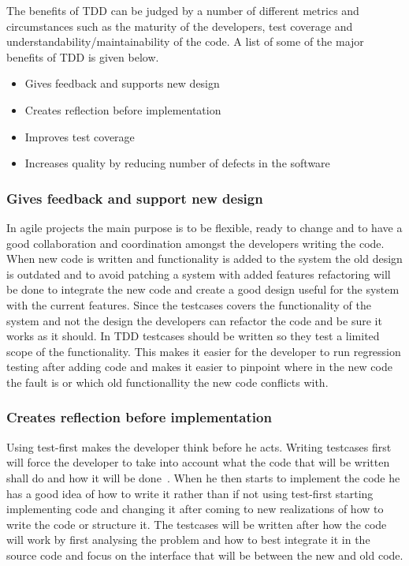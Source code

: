 
The benefits of TDD can be judged by a number of different metrics and circumstances such as the maturity of the developers, test coverage and understandability/maintainability of the code. A list of some of the major benefits of TDD is given below.

\begin{itemize}
\item Gives feedback and supports new design
\item Creates reflection before implementation
\item Improves test coverage
\item Increases quality by reducing number of defects in the software
\end{itemize}

\subsubsection*{Gives feedback and support new design}
In agile projects the main purpose is to be flexible, ready to change and to have a good collaboration and coordination amongst the developers writing the code. When new code is written and functionality is added to the system the old design is outdated and to avoid patching a system with added features refactoring will be done to integrate the new code and create a good design useful for the system with the current features. 
Since the testcases covers the functionality of the system and not the design the developers can refactor the code and be sure it works as it should. 
In TDD testcases should be written so they test a limited scope of the functionality. This makes it easier for the developer to run regression testing after adding code and makes it easier to pinpoint where in the new code the fault is or which old functionallity the new code conflicts with.

\subsubsection*{Creates reflection before implementation}
Using test-first makes the developer think before he acts. Writing testcases first will force the developer to take into account what the code that will be written shall do and how it will be done~\cite{erdogmus}. When he then starts to implement the code he has a good idea of how to write it rather than if not using test-first starting implementing code and changing it after coming to new realizations of how to write the code or structure it. The testcases will be written after how the code will work by first analysing the problem and how to best integrate it in the source code and focus on the interface that will be between the new and old code.

